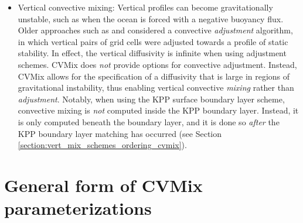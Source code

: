\begin{itemize}
\item {\sc Vertical convective mixing}: Vertical profiles can become
  gravitationally unstable, such as when the ocean is forced with a
  negative buoyancy flux.  Older approaches such as \cite{CoxModel}
  and \cite{Rahmstorf1993} considered a convective {\it adjustment}
  algorithm, in which vertical pairs of grid cells were adjusted
  towards a profile of static stability.  In effect, the vertical
  diffusivity is infinite when using adjustment schemes.  CVMix does
  {\it not} provide options for convective adjustment.  Instead, CVMix
  allows for the specification of a diffusivity that is large in
  regions of gravitational instability, thus enabling vertical
  convective {\it mixing} rather than {\it adjustment}.  Notably, when
  using the KPP surface boundary layer scheme, convective mixing is
  {\it not} computed inside the KPP boundary layer.  Instead, it is
  only computed beneath the boundary layer, and it is done so {\it
    after} the KPP boundary layer matching has occurred (see Section
  \ref{section:vert_mix_schemes_ordering_cvmix}).


\end{itemize}


\section{General form of CVMix parameterizations}
\label{section:vert_mix_schemes_general_cvmix}

